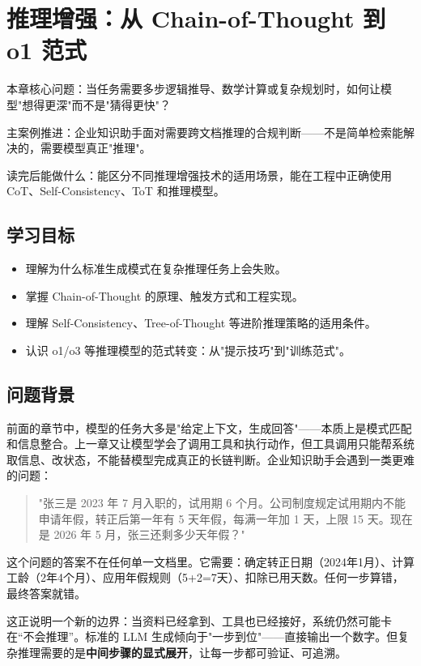 \chapter{推理增强：从 Chain-of-Thought 到 o1 范式}

\begin{introduction}
\item {\heiti 本章核心问题}：当任务需要多步逻辑推导、数学计算或复杂规划时，如何让模型"想得更深"而不是"猜得更快"？
\item {\heiti 主案例推进}：企业知识助手面对需要跨文档推理的合规判断——不是简单检索能解决的，需要模型真正"推理"。
\item {\heiti 读完后能做什么}：能区分不同推理增强技术的适用场景，能在工程中正确使用 CoT、Self-Consistency、ToT 和推理模型。
\end{introduction}

\section{学习目标}
\begin{itemize}
  \item 理解为什么标准生成模式在复杂推理任务上会失败。
  \item 掌握 Chain-of-Thought 的原理、触发方式和工程实现。
  \item 理解 Self-Consistency、Tree-of-Thought 等进阶推理策略的适用条件。
  \item 认识 o1/o3 等推理模型的范式转变：从"提示技巧"到"训练范式"。
\end{itemize}

\section{问题背景}
前面的章节中，模型的任务大多是"给定上下文，生成回答"——本质上是模式匹配和信息整合。上一章又让模型学会了调用工具和执行动作，但工具调用只能帮系统取信息、改状态，不能替模型完成真正的长链判断。企业知识助手会遇到一类更难的问题：

\begin{quote}
"张三是 2023 年 7 月入职的，试用期 6 个月。公司制度规定试用期内不能申请年假，转正后第一年有 5 天年假，每满一年加 1 天，上限 15 天。现在是 2026 年 5 月，张三还剩多少天年假？"
\end{quote}

这个问题的答案不在任何单一文档里。它需要：确定转正日期（2024年1月）、计算工龄（2年4个月）、应用年假规则（5+2=7天）、扣除已用天数。任何一步算错，最终答案就错。

这正说明一个新的边界：当资料已经拿到、工具也已经接好，系统仍然可能卡在“不会推理”。标准的 LLM 生成倾向于"一步到位"——直接输出一个数字。但复杂推理需要的是\textbf{中间步骤的显式展开}，让每一步都可验证、可追溯。

